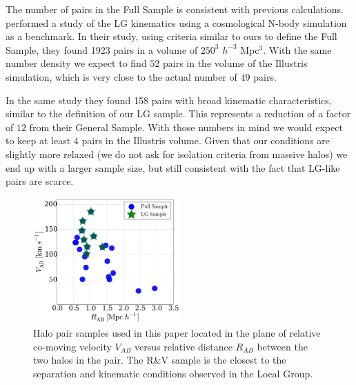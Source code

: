 The number of pairs in the Full Sample is consistent with previous
calculations. 
\cite{ForeroRomero2013} performed a study of the LG kinematics using a
cosmological N-body simulation as a benchmark. 
In their study, using criteria similar to ours to define the Full
Sample, they found 1923 pairs in a volume of $250^3$ $h^{-3}$
Mpc$^{3}$. 
With the same number density we expect to find $52$ pairs in the
volume of the Illustris simulation, which is very close to the actual
number of $49$ pairs.





In the same study they found 158 pairs with broad kinematic
characteristics, similar to the definition of our LG sample. 
This represents a reduction of a factor of $12$ from their General
Sample. 
With those numbers in mind we would expect to keep at least $4$ pairs
in the Illustris volume. 
Given that our conditions are slightly more relaxed (we do not ask for
isolation criteria from massive halos) we end up with a larger sample
size, but still consistent with the fact that LG-like pairs are
scarce.  


\begin{figure}
\centering
\includegraphics[width=0.5\textwidth]{v_r_pairs.pdf}
\caption{Halo pair samples used in this paper located in the
  plane of relative co-moving velocity $V_{AB}$ versus relative
  distance $R_{AB}$ between the two halos in the pair.
  The R\&V sample is the closest to the separation and kinematic
  conditions observed in the Local Group.}
\label{fig:samples}
\end{figure}


